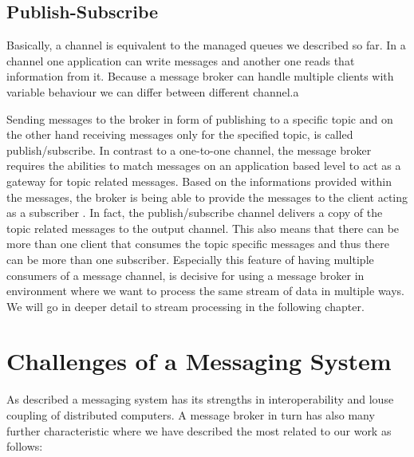 
\subsection{Publish-Subscribe}
\label{intro-messaging-publishsubscribe}

Basically, a channel is equivalent to the managed queues we described so far. In
a channel one application can write messages and another one reads that
information from it. Because a message broker can handle multiple clients with
variable behaviour we can differ between different channel.a



Sending messages to the broker in form of publishing to a specific topic and on
the other hand receiving messages only for the specified topic, is called
publish/subscribe. In contrast to a one-to-one channel, the message broker
requires the abilities to match messages on an application based level to act as
a gateway for topic related messages. Based on the informations provided within
the messages, the broker is being able to provide the messages to the client
acting as a subscriber \cite{TAN06}. In fact, the publish/subscribe channel
delivers a copy of the topic related messages to the output channel. This also
means that there can be more than one client that consumes the topic specific
messages and thus there can be more than one subscriber. Especially this feature
of having multiple consumers of a message channel, is decisive for using a
message broker in environment where we want to process the same stream of
data in multiple ways. We will go in deeper detail to stream processing in the
following chapter. \cite{EIP03}


\section{Challenges of a Messaging System}
\label{intro-messaging-characteristics}
As described a messaging system has its strengths in interoperability and louse
coupling of distributed computers. 
A message broker in turn has also many further
characteristic where we have described the most related to our work as follows:  

